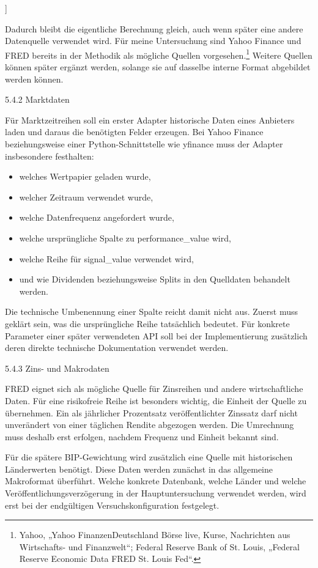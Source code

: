 \documentclass[
  ngerman,
  a4paper,
  DIV=11,
  oneside]{scrreprt}
\providecommand{\tightlist}{%
  \setlength{\itemsep}{0pt}\setlength{\parskip}{0pt}}
\begin{document}
{]}

Dadurch bleibt die eigentliche Berechnung gleich, auch wenn später eine
andere Datenquelle verwendet wird. Für meine Untersuchung sind Yahoo
Finance und FRED bereits in der Methodik als mögliche Quellen
vorgesehen.\footnote{Yahoo, {„Yahoo FinanzenDeutschland \textbar{} Börse
  live, Kurse, Nachrichten aus Wirtschafts- und Finanzwelt``}; Federal
  Reserve Bank of St. Louis, {„Federal {Reserve Economic Data}
  \textbar{} {FRED} \textbar{} {St}. {Louis Fed}``}.} Weitere Quellen
können später ergänzt werden, solange sie auf dasselbe interne Format
abgebildet werden können.

5.4.2 Marktdaten

Für Marktzeitreihen soll ein erster Adapter historische Daten eines
Anbieters laden und daraus die benötigten Felder erzeugen. Bei Yahoo
Finance beziehungsweise einer Python-Schnittstelle wie yfinance muss der
Adapter insbesondere festhalten:

\begin{itemize}
\tightlist
\item
  welches Wertpapier geladen wurde,
\item
  welcher Zeitraum verwendet wurde,
\item
  welche Datenfrequenz angefordert wurde,
\item
  welche ursprüngliche Spalte zu performance\_value wird,
\item
  welche Reihe für signal\_value verwendet wird,
\item
  und wie Dividenden beziehungsweise Splits in den Quelldaten behandelt
  werden.
\end{itemize}

Die technische Umbenennung einer Spalte reicht damit nicht aus. Zuerst
muss geklärt sein, was die ursprüngliche Reihe tatsächlich bedeutet. Für
konkrete Parameter einer später verwendeten API soll bei der
Implementierung zusätzlich deren direkte technische Dokumentation
verwendet werden.

5.4.3 Zins- und Makrodaten

FRED eignet sich als mögliche Quelle für Zinsreihen und andere
wirtschaftliche Daten. Für eine risikofreie Reihe ist besonders wichtig,
die Einheit der Quelle zu übernehmen. Ein als jährlicher Prozentsatz
veröffentlichter Zinssatz darf nicht unverändert von einer täglichen
Rendite abgezogen werden. Die Umrechnung muss deshalb erst erfolgen,
nachdem Frequenz und Einheit bekannt sind.

Für die spätere BIP-Gewichtung wird zusätzlich eine Quelle mit
historischen Länderwerten benötigt. Diese Daten werden zunächst in das
allgemeine Makroformat überführt. Welche konkrete Datenbank, welche
Länder und welche Veröffentlichungsverzögerung in der Hauptuntersuchung
verwendet werden, wird erst bei der endgültigen Versuchskonfiguration
festgelegt.
\end{document}
